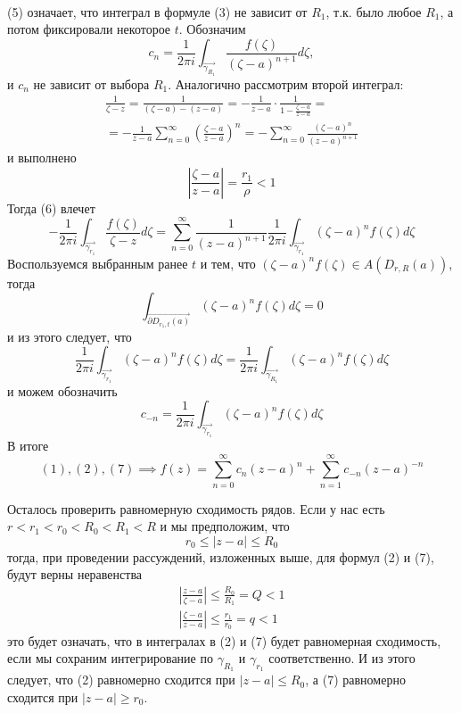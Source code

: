 \documentclass[main]{subfiles}
\begin{document}
\begin{longProof}
\begin{gather*}
    \end{gather*}
    (5) означает, что интеграл в формуле (3) не зависит от $R_1$, т.к. было любое $R_1$, а потом фиксировали некоторое $t$.
    Обозначим
    \[c_n = \frac{1}{2 \pi i}  \int_{\overrightarrow{\gamma_{R_1}}} \frac{f(\zeta)}{(\zeta -a)^{n+1}} d\zeta,\]
    и $c_n$ не зависит от выбора $R_1$.
    Аналогично рассмотрим второй интеграл:
    \begin{multline*}
        \frac{1}{\zeta - z} = \frac{1}{(\zeta - a) - (z - a)} = -\frac{1}{z - a}\cdot \frac{1}{1 - \frac{\zeta - a}{z - a}} = \\
        = -\frac{1}{z - a} \sum_{n = 0 }^{\infty} \left(\frac{\zeta - a}{z -a}\right)^n = - \sum_{n = 0 }^{\infty} \frac{(\zeta- a)^n}{(z -a)^{n+1}} \tag{6}
    \end{multline*}
    и выполнено
    \[\left| \frac{\zeta - a}{z - a} \right| = \frac{r_1}{\rho} < 1\]
    Тогда (6) влечет
    \[- \frac{1}{2 \pi i } \int_{\overrightarrow{\gamma_{r_1}}} \frac{f(\zeta)}{\zeta - z} d\zeta  = \sum_{n = 0 }^{\infty} \frac{1}{(z-a)^{n+1}} \frac{1}{2 \pi i} \int_{\overrightarrow{\gamma_{r_1}}} (\zeta - a)^n f(\zeta) d\zeta \tag{7} \]
    Воспользуемся выбранным ранее $t$ и тем, что $(\zeta - a)^n f(\zeta) \in A(D_{r, R}(a))$, тогда
    \[\int_{\overrightarrow{\partial D_{r_1, t} (a)}}  (\zeta - a)^n f(\zeta) d\zeta = 0 \tag{8}\]
    и из этого следует, что
    \[\frac{1}{2 \pi i} \int_{\overrightarrow{\gamma_{r_1}}} (\zeta - a)^n f(\zeta) d\zeta =  \frac{1}{2 \pi i}  \int_{\overrightarrow{\gamma_{R_1}}} (\zeta - a)^n f(\zeta) d\zeta \tag{9}\]
    и можем обозначить
    \[c_{-n} = \frac{1}{2 \pi i} \int_{\overrightarrow{\gamma_{r_1}}} (\zeta - a)^n f(\zeta) d\zeta\]
    В итоге
    \[(1), (2), (7) \implies f(z) = \sum_{n=0}^{\infty} c_{n} (z-a)^n + \sum_{n=1}^{\infty} c_{-n} (z-a)^{-n}\]

    Осталось проверить равномерную сходимость рядов.
    Если у нас есть $r < r_1 < r_0 < R_0 < R_1 < R$ и мы предположим, что
    \[r_0 \le |z-a| \le R_0\]
    тогда, при проведении рассуждений, изложенных выше, для формул (2) и (7), будут верны неравенства
    \begin{gather*}
        \left| \frac{z-a}{\zeta - a} \right| \le \frac{R_0}{R_1} = Q < 1\\
        \left| \frac{\zeta - a}{z - a} \right| \le \frac{r_1}{r_0} = q < 1
    \end{gather*}
    это будет означать, что в интегралах в (2) и (7) будет равномерная сходимость, если мы сохраним интегрирование по $\gamma_{R_1}$ и $\gamma_{r_1}$ соответственно.
    И из этого следует, что (2) равномерно сходится при $|z - a| \le R_0$, а (7) равномерно сходится при $|z - a| \ge r_0$.
\end{longProof}
\end{document}
